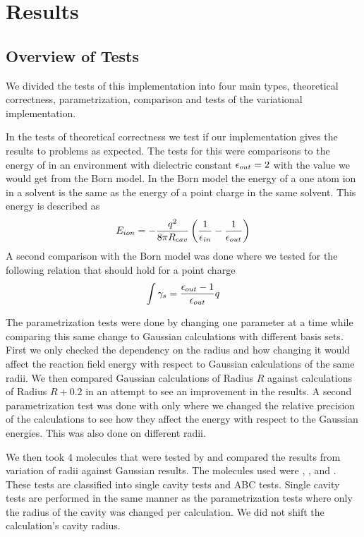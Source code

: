 \documentclass[../master_thesis.tex]{subfiles}
\begin{document}
\chapter{Results}\label{chap:Results}
\section{Overview of Tests}
We divided the tests of this implementation into four main types, theoretical
correctness, parametrization, comparison and tests of the variational implementation.

In the tests of theoretical correctness we test if our implementation gives the
results to problems as expected. The tests for this were comparisons to
the energy of   in an environment with dielectric constant $\epsilon_{out} = 2$
with the value we would get from the Born model. In the Born model the energy of a  %
one atom ion in a solvent is the same as the energy of a point charge in the same solvent.
This energy is described as
\begin{equation}
  E_{ion} = -\frac{q^{2}}{8 \pi R_{cav}}\left(\frac{1}{\epsilon_{in}\\}-\frac{1}{\epsilon_{out}}\right)
\end{equation}
A second comparison with the Born model was done where we tested for the
following relation that should hold for a point charge
\begin{equation}
  \int \gamma_s = \frac{\epsilon_{out} - 1}{\epsilon_{out}} q
\end{equation}

The parametrization tests were done by changing one parameter at a time while
comparing this same change to Gaussian calculations with different basis sets.
First we only checked the dependency on the radius and how changing it would
affect the reaction field energy with respect to Gaussian calculations of the same
radii. We then compared Gaussian calculations of Radius $R$ against \mrchem
calculations of Radius $R+0.2$ in an attempt to see an improvement in the
results.
A second parametrization test was done with only 
where we changed the relative precision of the \mrchem calculations to see how
they affect the energy with respect to the Gaussian energies. This was also done
on different radii.

We then took 4 molecules that were tested by \cite{Chipman2002} and compared the
results from variation of radii against Gaussian results. The molecules used
were , ,  and . These tests are classified into
single cavity tests and \ac{ABC} tests. Single cavity tests are performed in the
same manner as the parametrization tests where only the radius of the cavity was changed per
calculation. We did not shift the \mrchem calculation's cavity radius.
\end{document}
